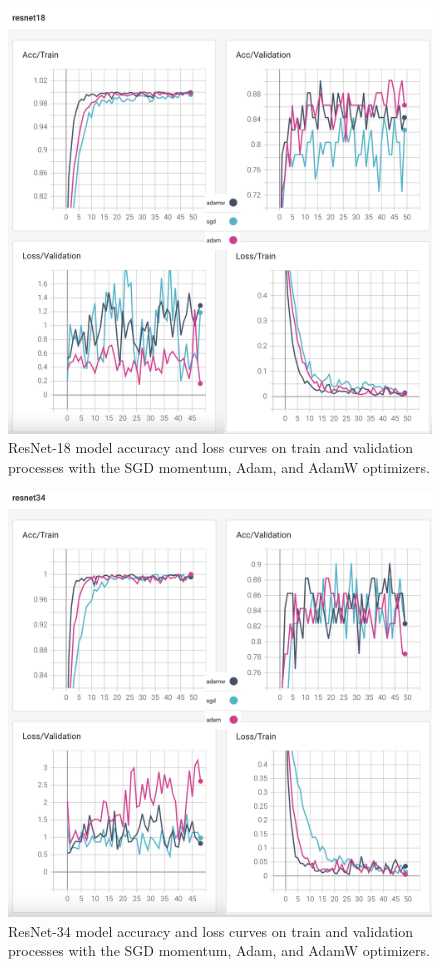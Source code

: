 \begin{figure}[!h]
	\centering
	\includegraphics[width=\linewidth]{fig/resnet18.png}
	\vspace{2mm}
	\caption{ResNet-18 model accuracy and loss curves on train and validation processes with the SGD momentum, Adam, and AdamW optimizers.}
	\label{fig:resnet18_plots}
\end{figure}

\begin{figure}[!h]
	\centering
	\includegraphics[width=\linewidth]{fig/resnet34.png}
	\vspace{2mm}
	\caption{ResNet-34 model accuracy and loss curves on train and validation processes with the SGD momentum, Adam, and AdamW optimizers.}
	\label{fig:resnet34_plots}
\end{figure}

